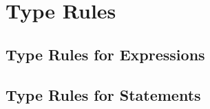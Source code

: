 \section{Type Rules}

\subsection{Type Rules for Expressions}

\subsection{Type Rules for Statements}


